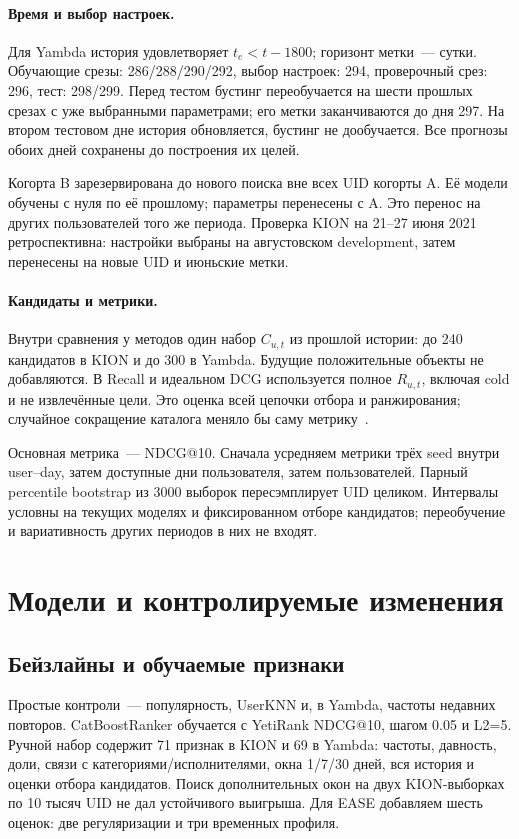 \documentclass[10pt,a4paper,twocolumn]{article}
\begin{document}
\paragraph{Время и выбор настроек.}
Для Yambda история удовлетворяет $t_e<t-1800$; горизонт метки~--- сутки.
Обучающие срезы: 286/288/290/292, выбор настроек: 294,
проверочный срез: 296, тест: 298/299. Перед тестом бустинг переобучается
на шести прошлых срезах с уже выбранными параметрами; его метки заканчиваются
до дня 297. На втором тестовом дне история обновляется, бустинг не дообучается.
Все прогнозы обоих дней сохранены до построения их целей.

Когорта B зарезервирована до нового поиска вне всех UID когорты A.
Её модели обучены с нуля по её прошлому; параметры перенесены с A.
Это перенос на других пользователей того же периода.
Проверка KION на 21--27 июня 2021 ретроспективна: настройки выбраны
на августовском development, затем перенесены на новые UID и июньские метки.

\paragraph{Кандидаты и метрики.}
Внутри сравнения у методов один набор $C_{u,t}$ из прошлой истории:
до 240 кандидатов в KION и до 300 в Yambda.
Будущие положительные объекты не добавляются. В Recall и идеальном DCG
используется полное $R_{u,t}$, включая cold и не извлечённые цели.
Это оценка всей цепочки отбора и ранжирования; случайное сокращение
каталога меняло бы саму метрику~\cite{metrics}.

Основная метрика~--- NDCG@10. Сначала усредняем метрики трёх seed
внутри user--day, затем доступные дни пользователя, затем пользователей.
Парный percentile bootstrap из 3000 выборок пересэмплирует UID целиком.
Интервалы условны на текущих моделях и фиксированном отборе кандидатов;
переобучение и вариативность других периодов в них не входят.

\section{Модели и контролируемые изменения}

\subsection{Бейзлайны и обучаемые признаки}
Простые контроли~--- популярность, UserKNN и, в Yambda,
частоты недавних повторов. CatBoostRanker обучается с YetiRank NDCG@10,
шагом 0.05 и L2=5. Ручной набор содержит 71 признак в KION
и 69 в Yambda: частоты, давность, доли, связи с категориями/исполнителями,
окна 1/7/30 дней, вся история и оценки отбора кандидатов.
Поиск дополнительных окон на двух KION-выборках по 10 тысяч UID
не дал устойчивого выигрыша. Для EASE добавляем шесть оценок:
две регуляризации и три временных профиля.
\end{document}

